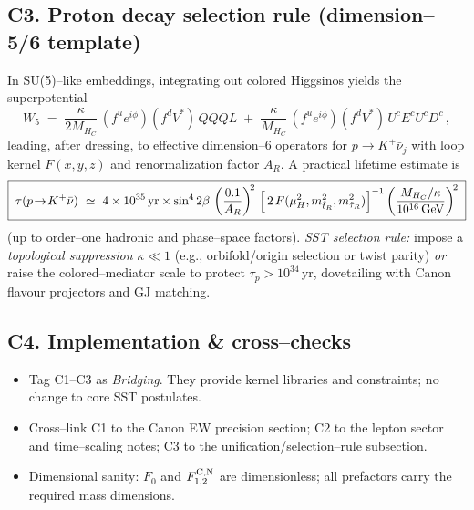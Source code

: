 \documentclass[11pt]{article}
\begin{document}
  \subsection*{C3. Proton decay selection rule (dimension--5/6 template)}
      In SU(5)--like embeddings, integrating out colored Higgsinos yields the superpotential
      \begin{equation}
      W_5 \;=\; \frac{\kappa}{2M_{H_C}}\,(f^u e^{i\phi})(f^d V^*)\,QQQL
      \;+\; \frac{\kappa}{M_{H_C}}\,(f^u e^{i\phi})(f^d V^*)\,U^c E^c U^c D^c \,,
      \end{equation}
      leading, after dressing, to effective dimension--6 operators for $p\to K^+\bar\nu_j$ with loop kernel $F(x,y,z)$ and renormalization factor $A_R$. A practical lifetime estimate is
      \begin{equation}
      \boxed{\;
      \tau(p\!\to\!K^+\bar\nu)\ \simeq\
          4\times 10^{35}\,\text{yr}\times
          \sin^4 2\beta\,
          \left(\frac{0.1}{A_R}\right)^{\!2}\,
          \Bigl[\,2\,F(\mu_H^2, m_{\tilde t_R}^2, m_{\tilde\tau_R}^2)\Bigr]^{-1}
          \left(\frac{M_{H_C}/\kappa}{10^{16}\,\text{GeV}}\right)^{\!2}
          \;}
      \end{equation}
      (up to order--one hadronic and phase--space factors).
      \textit{SST selection rule:} impose a \emph{topological suppression} $\kappa\ll1$ (e.g., orbifold/origin selection or twist parity) \emph{or} raise the colored--mediator scale to protect $\tau_p>10^{34}\,$yr, dovetailing with Canon flavour projectors and GJ matching.

  \subsection*{C4. Implementation \& cross--checks}
      \begin{itemize}
      \item Tag C1--C3 as \emph{Bridging}. They provide kernel libraries and constraints; no change to core SST postulates.
      \item Cross--link C1 to the Canon EW precision section; C2 to the lepton sector and time--scaling notes; C3 to the unification/selection--rule subsection.
      \item Dimensional sanity: $F_0$ and $F^{\rm C,N}_{1,2}$ are dimensionless; all prefactors carry the required mass dimensions.
      \end{itemize}
\end{document}
